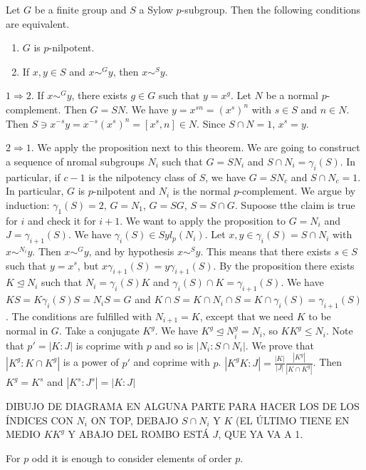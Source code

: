 \documentclass[twoside, 11pt]{article}
\begin{document}
\begin{teorema}
Let $G$ be a finite group and $S$ a Sylow $p$-subgroup. Then the following conditions are equivalent.
\begin{enumerate}
\item $G$ is $p$-nilpotent.
\item If $x,y\in S$ and $x\sim^G y$, then $x\sim^S y$.
\end{enumerate}
\end{teorema}

\begin{dem}
$1\Rightarrow 2$. If $x\sim^G y$, there exists $g\in G$ such that $y=x^g$. Let $N$ be a normal $p$-complement. Then $G=SN$. We have $y=x^{sn}=(x^s)^n$ with $s\in S$ and $n\in N$. Then $S\ni x^{-s}y=x^{-s}(x^s)^n=[x^s,n]\in N$. Since $S\cap N=1$, $x^s=y$. 

$2\Rightarrow 1$. We apply the proposition next to this theorem. We are going to construct a sequence of nromal subgroups $N_i$ such that $G=SN_i$ and $S\cap N_i=\gamma_i(S)$. In particular, if $c-1$ is the nilpotency class of $S$, we have $G=SN_c$ and $S\cap N_c=1$. In particular, $G$ is $p$-nilpotent and $N_i$ is the normal $p$-complement. We argue by induction: $\gamma_1(S)=2$, $G=N_1$, $G=SG$, $S=S\cap G$. Supoose tthe claim is true for $i$ and check it for $i+1$. We want to apply the proposition to $G=N_i$ and $J=\gamma_{i+1}(S)$. We have $\gamma_i(S)\in Syl_p(N_i)$. Let $x,y\in \gamma_i(S)=S\cap N_i$ with $x\sim^{N_i} y$. Then $x\sim^G y$, and by hypothesis $x\sim^S y$. This means that there exists $s\in S$ such that $y=x^s$, but $x\gamma_{i+1}(S)=y\gamma_{i+1}(S)$. By the proposition there exists $K\trianglelefteq N_i$ such that $N_i=\gamma_i(S)K$ and $\gamma_i(S)\cap K=\gamma_{i+1}(S)$. We have $KS=K\gamma_i(S)S=N_iS=G$ and $K\cap S=K\cap N_i\cap S=K\cap\gamma_i(S)=\gamma_{i+1}(S)$. The conditions are fulfilled with $N_{i+1}=K$, except that we need $K$ to be normal in $G$. Take a conjugate $K^g$. We have $K^g\trianglelefteq N_i^g=N_i$, so $KK^g\leq N_i$. Note that $p'=|K:J|$ is coprime with $p$ and so is $|N_i: S\cap N_i|$. We prove that $|K^g : K\cap K^g|$ is a power of $p'$ and coprime with $p$. $|K^gK:J|=\frac{|K|}{|J|}\frac{|K^g|}{|K\cap K^g|}$. Then $K^g=K^s$ and $|K^s:J^s|=|K:J|$

DIBUJO DE DIAGRAMA EN ALGUNA PARTE PARA HACER LOS DE LOS ÍNDICES CON $N_i$ ON TOP, DEBAJO $S\cap N_i$ Y $K$ (EL ÚLTIMO TIENE EN MEDIO $KK^g$ Y ABAJO DEL ROMBO ESTÁ $J$, QUE YA VA A 1. 
\end{dem}
For $p$ odd it is enough to consider elements of order $p$. 
\end{document}
